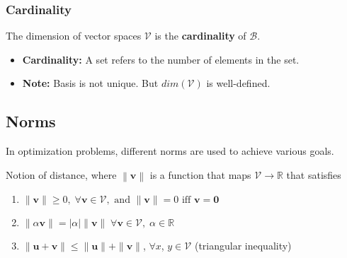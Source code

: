 \subsubsection{Cardinality}
\begin{definition}
    The dimension of vector spaces $\mathcal{V}$ is the \textbf{cardinality} of $\mathcal{B}$.
    \begin{itemize}
        \item \textbf{Cardinality:} A set refers to the number of elements in the set.
        \item \textbf{Note:} Basis is not unique. But $dim(\mathcal{V})$ is well-defined.
    \end{itemize}
\end{definition}

\subsection{Norms}
In optimization problems, different norms are used to achieve various goals.
\begin{definition}
    Notion of distance, where $\left\lVert \mathbf{v} \right\rVert$ is a function that maps $\mathcal{V} \rightarrow \mathbb{R}$ that satisfies 
    \begin{enumerate}
        \item \( \| \mathbf{v} \| \geq 0, \; \forall \mathbf{v} \in \mathcal{V}, \text{ and } \| \mathbf{v} \| = 0 \text{ iff } \mathbf{v} = \mathbf{0} \)
        \item \( \| \alpha \mathbf{v} \| = |\alpha| \| \mathbf{v} \| \; \forall \mathbf{v} \in \mathcal{V}, \; \alpha \in \mathbb{R} \)
        \item \( \| \mathbf{u} + \mathbf{v} \| \leq \| \mathbf{u} \| + \| \mathbf{v} \| \), $\forall x$, $y\in \mathcal{V}$ (triangular inequality)
    \end{enumerate}
\end{definition}

